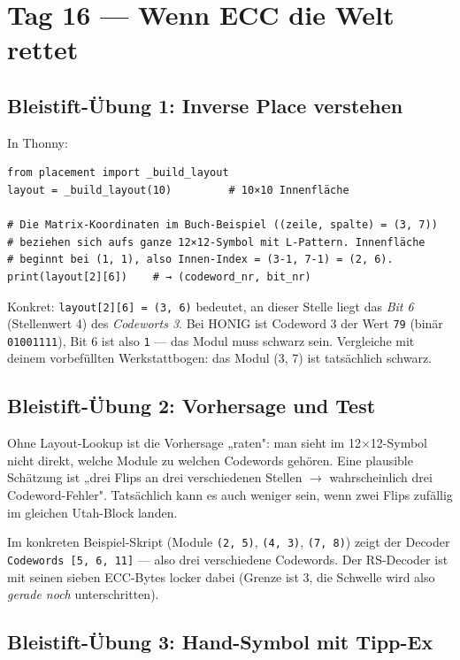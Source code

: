 \section*{Tag 16 — Wenn ECC die Welt rettet}

\subsection*{Bleistift-Übung 1: Inverse Place verstehen}

In Thonny:

\begin{verbatim}
from placement import _build_layout
layout = _build_layout(10)         # 10×10 Innenfläche

# Die Matrix-Koordinaten im Buch-Beispiel ((zeile, spalte) = (3, 7))
# beziehen sich aufs ganze 12×12-Symbol mit L-Pattern. Innenfläche
# beginnt bei (1, 1), also Innen-Index = (3-1, 7-1) = (2, 6).
print(layout[2][6])    # → (codeword_nr, bit_nr)
\end{verbatim}

Konkret: \texttt{layout[2][6] = (3, 6)} bedeutet, an dieser Stelle
liegt das \emph{Bit 6} (Stellenwert 4) des \emph{Codeworts 3}.
Bei HONIG ist Codeword 3 der Wert \texttt{79} (binär \texttt{01001111}),
Bit 6 ist also \texttt{1} — das Modul muss schwarz sein. Vergleiche
mit deinem vorbefüllten Werkstattbogen: das Modul (3, 7) ist
tatsächlich schwarz.

\subsection*{Bleistift-Übung 2: Vorhersage und Test}

Ohne Layout-Lookup ist die Vorhersage „raten": man sieht im
12$\times$12-Symbol nicht direkt, welche Module zu welchen Codewords
gehören. Eine plausible Schätzung ist „drei Flips an drei
verschiedenen Stellen $\to$ wahrscheinlich drei Codeword-Fehler".
Tatsächlich kann es auch weniger sein, wenn zwei Flips zufällig im
gleichen Utah-Block landen.

Im konkreten Beispiel-Skript (Module \texttt{(2, 5)}, \texttt{(4, 3)},
\texttt{(7, 8)}) zeigt der Decoder \texttt{Codewords [5, 6, 11]} —
also drei verschiedene Codewords. Der RS-Decoder ist mit seinen
sieben ECC-Bytes locker dabei (Grenze ist 3, die Schwelle wird also
\emph{gerade noch} unterschritten).

\subsection*{Bleistift-Übung 3: Hand-Symbol mit Tipp-Ex}

